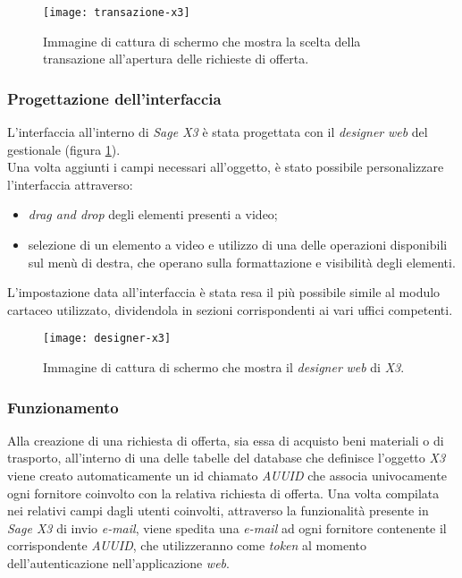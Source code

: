 \begin{figure}[htbp]
	\begin{center}
		\texttt{[image: transazione-x3]}
		\caption{Immagine di cattura di schermo che mostra la scelta della transazione all'apertura delle richieste di offerta.}
	\end{center}
\end{figure}

\subsubsection{Progettazione dell'interfaccia}
L'interfaccia all'interno di \textit{Sage X3} è stata progettata con il \textit{designer} \textit{web} del gestionale (figura \ref{fig:designer-web}).\\
Una volta aggiunti i campi necessari all'oggetto, è stato possibile personalizzare l'interfaccia attraverso:
\begin{itemize}
	\item \textit{drag and drop} degli elementi presenti a video;
	\item  selezione di un elemento a video e utilizzo di una delle operazioni disponibili sul menù di destra, che operano sulla formattazione e visibilità degli elementi.
\end{itemize}
L'impostazione data all'interfaccia è stata resa il più possibile simile al modulo cartaceo utilizzato, dividendola in sezioni corrispondenti ai vari uffici competenti.

\begin{figure}[htbp]
	\begin{center}
		\texttt{[image: designer-x3]}
		\caption{Immagine di cattura di schermo che mostra il \textit{designer} \textit{web} di \textit{X3}.}
		\label{fig:designer-web}
	\end{center}
\end{figure}

\subsubsection{Funzionamento}
Alla creazione di una richiesta di offerta, sia essa di acquisto beni materiali o di trasporto, all'interno di una delle tabelle del database che definisce l'oggetto \textit{X3} viene creato automaticamente un id chiamato \textit{AUUID} che associa univocamente ogni fornitore coinvolto con la relativa richiesta di offerta.
Una volta compilata nei relativi campi dagli utenti coinvolti, attraverso la funzionalità presente in \textit{Sage X3} di invio \textit{e-mail}, viene spedita una \textit{e-mail} ad ogni fornitore contenente il corrispondente \textit{AUUID}, che utilizzeranno come \textit{token} al momento dell'autenticazione nell'applicazione \textit{web}.

